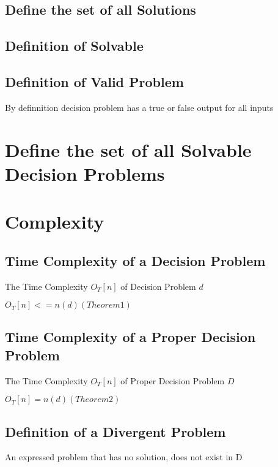 \documentclass[11pt]{article}
\begin{document}
\subsection{Define the set of all Solutions}

\subsection{Definition of Solvable}

\subsection{Definition of Valid Problem}
By definnition decision problem has a true or false output for all inputs

\section{Define the set of all Solvable Decision Problems}











\section*{Complexity}
\subsection{Time Complexity of a Decision Problem}
The Time Complexity $O_T [n]$ of Decision Problem $d$
\begin{center}
$
O_T[n] <= n(d) (Theorem 1)
$
\end{center}
\subsection{Time Complexity of a Proper Decision Problem}
The Time Complexity $O_T [n]$ of Proper Decision Problem $D$
\begin{center}
$
O_T[n] = n(d) (Theorem 2)
$
\end{center}













\subsection{Definition of a Divergent Problem}
An expressed problem that has no solution, does not exist in D
\end{document}
